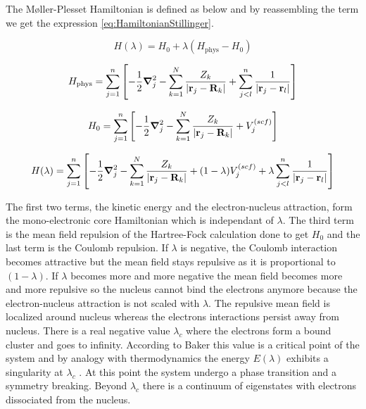 \documentclass[11pt,a4paper]{article}
\begin{document}
The M{\o}ller-Plesset Hamiltonian is defined as below and by reassembling the term we get the expression \eqref{eq:HamiltonianStillinger}.

\begin{equation}
H(\lambda)=H_0 + \lambda (H_\text{phys} - H_0)    
\end{equation}

\begin{equation}
    H_\text{phys}=\sum\limits_{j=1}^{n}\left[ -\frac{1}{2}\grad_j^2 - \sum\limits_{k=1}^{N} \frac{Z_k}{|\vb{r}_j-\vb{R}_k|}+\sum\limits_{j<l}^{n}\frac{1}{|\vb{r}_j-\vb{r}_l|}\right]
\end{equation}

\begin{equation}
    H_0=\sum\limits_{j=1}^{n}\left[ -\frac{1}{2}\grad_j^2 - \sum\limits_{k=1}^{N} \frac{Z_k}{|\vb{r}_j-\vb{R}_k|}+V_j^{(scf)}\right]
\end{equation}

\begin{equation}
    H(\lambda)=\sum\limits_{j=1}^{n}\left[-\frac{1}{2}\grad_j^2 - \sum\limits_{k=1}^{N} \frac{Z_k}{|\vb{r}_j-\vb{R}_k|} + (1-\lambda)V_j^{(scf)}+\lambda\sum\limits_{j<l}^{n}\frac{1}{|\vb{r}_j-\vb{r}_l|} \right]
\label{eq:HamiltonianStillinger}
\end{equation}

The first two terms, the kinetic energy and the electron-nucleus attraction, form the mono-electronic core Hamiltonian which is independant of $\lambda$. The third term is the mean field repulsion of the Hartree-Fock calculation done to get $H_0$ and the last term is the Coulomb repulsion. If $\lambda$ is negative, the Coulomb interaction becomes attractive but the mean field stays repulsive as it is proportional to $(1-\lambda)$. If $\lambda$ becomes more and more negative the mean field becomes more and more repulsive so the nucleus cannot bind the electrons anymore because the electron-nucleus attraction is not scaled with $\lambda$. The repulsive mean field is localized around nucleus whereas the electrons interactions persist away from nucleus. There is a real negative value $\lambda_c$ where the electrons form a bound cluster and goes to infinity. According to Baker this value is a critical point of the system and by analogy with thermodynamics the energy $E(\lambda)$ exhibits a singularity at $\lambda_c$ \cite{Baker_1971}. At this point the system undergo a phase transition and a symmetry breaking. Beyond $\lambda_c$ there is a continuum of eigenstates with electrons dissociated from the nucleus.
\end{document}
